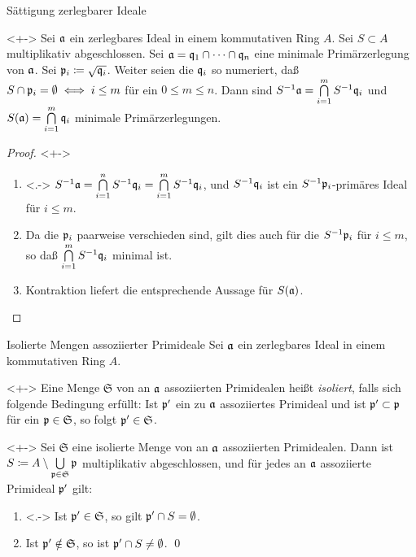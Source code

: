 \begin{frame}{Sättigung zerlegbarer Ideale}
	\begin{proposition}<+->
		\label{prop:sat_decomp}
		Sei \(\mathfrak{a}\) ein zerlegbares Ideal in einem kommutativen Ring \(A\).
		Sei \(S \subset A\) multiplikativ abgeschlossen. Sei
		\(\mathfrak{a} = \mathfrak{q}_1 \cap \dotsb \cap \mathfrak{q}_n\) eine minimale
		Primärzerlegung von \(\mathfrak{a}\). Sei \(\mathfrak{p}_i \coloneqq
		\sqrt{\mathfrak{q}_i}\). Weiter seien die \(\mathfrak{q}_i\) so
		numeriert, daß \(S \cap \mathfrak{p}_i = \emptyset \iff
		i \leq m\) für ein \(0 \leq m \leq n\). Dann sind
		\(S^{-1} \mathfrak{a} = \bigcap\limits_{i = 1}^m S^{-1} \mathfrak{q}_i\)
		und \(S(\mathfrak{a}) = \bigcap\limits_{i = 1}^m \mathfrak{q}_i\)
		minimale Primärzerlegungen.
	\end{proposition}
	\begin{proof}<+->
		\begin{enumerate}[<+->]
		\item<.->
			\(S^{-1} \mathfrak{a} = \bigcap\limits_{i = 1}^n S^{-1} \mathfrak{q}_i
			= \bigcap\limits_{i = 1}^m S^{-1} \mathfrak{q}_i\), und
			\(S^{-1} \mathfrak{q}_i\) ist ein
			\(S^{-1} \mathfrak{p}_i\)-primäres Ideal für \(i \leq m\).
		\item
			Da die \(\mathfrak{p}_i\) paarweise verschieden sind, gilt dies auch
			für die \(S^{-1} \mathfrak{p}_i\) für \(i \leq m\), so daß
			\(\bigcap\limits_{i = 1}^m S^{-1} \mathfrak{q}_i\) minimal ist.
		\item
			Kontraktion liefert die entsprechende Aussage
			für \(S(\mathfrak{a})\).
			\qedhere
		\end{enumerate}
	\end{proof}
\end{frame}

\begin{frame}{Isolierte Mengen assoziierter Primideale}
	Sei \(\mathfrak{a}\) ein zerlegbares Ideal in einem kommutativen Ring \(A\).
	\begin{definition}<+->
		Eine Menge \(\mathfrak S\) von an \(\mathfrak{a}\) assoziierten Primidealen
		heißt \emph{isoliert}, falls sich folgende Bedingung erfüllt: Ist
		\(\mathfrak{p}'\) ein zu \(\mathfrak{a}\) assoziiertes Primideal und ist
		\(\mathfrak{p}' \subset \mathfrak{p}\) für ein \(\mathfrak{p} \in \mathfrak S\),
		so folgt \(\mathfrak{p}' \in \mathfrak S\).
	\end{definition}
	\begin{proposition}<+->
		Sei \(\mathfrak S\) eine isolierte Menge von an \(\mathfrak{a}\)
		assoziierten Primidealen. Dann ist \(S \coloneqq A \setminus
		\bigcup\limits_{\mathfrak{p} \in \mathfrak S} \mathfrak{p}\) multiplikativ
		abgeschlossen, und für jedes an \(\mathfrak{a}\) assoziierte Primideal
		\(\mathfrak{p}'\) gilt:
		\begin{enumerate}[<+->]
		\item<.->
			Ist \(\mathfrak{p}' \in \mathfrak S\), so gilt
			\(\mathfrak{p}' \cap S = \emptyset\).
		\item
			Ist \(\mathfrak{p}' \notin \mathfrak S\), so ist
			\(\mathfrak{p}' \cap S \neq \emptyset\).
			\qed
		\end{enumerate}
	\end{proposition}
\end{frame}

